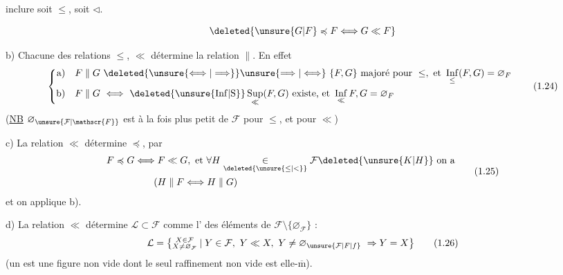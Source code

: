 inclure soit $\leq$, soit $\triangleleft$.

\[
\deleted{\unsure{G|F}\preccurlyeq F\Longleftrightarrow G\ll F}
\]

b) Chacune des relations $\leq$, $\ll$ détermine la relation $\parallel$. En effet
\[
\left\{\begin{aligned}
\text{a)}\quad F\parallel G &\ \deleted{\unsure{\Longleftrightarrow|\Longrightarrow}}\unsure{\Longrightarrow|\Longleftrightarrow}\
 \{F,G\}\ \text{majoré pour }\leq,\ \text{et }\mathop{\mathrm{Inf}}\limits_{\leq}(F,G)=\varnothing_F\\
\text{b)}\quad F\parallel G &\ \Longleftrightarrow\
 \deleted{\unsure{\mathrm{Inf}|\mathrm{S}}}\mathop{\mathrm{Sup}}\limits_{\ll}(F,G)\ \text{existe, et }\mathop{\mathrm{Inf}}\limits_{\ll} F,G=\varnothing_F
\end{aligned}\right.
\tag*{(1.24)}
\]
(\uline{NB} $\varnothing_{\unsure{\mathcal{F}|\mathscr{F}}}$ est à la fois plus petit  de $\mathcal{F}$ pour $\leq$, et pour $\ll$)

c) La relation $\ll$ détermine $\preccurlyeq$, par
\margin{$\times$}
\[
\begin{aligned}
F\preccurlyeq G &\Longleftrightarrow F\ll G,\ \text{et }\forall H\underset{\deleted{\unsure{\leq|<}}}{\in}\mathcal{F}\deleted{\unsure{K|H}}\ \text{on a}\\
&\hspace{2em}(H\parallel F\Longleftrightarrow H\parallel G)
\end{aligned}
\tag*{(1.25)}
\]
et on applique b).

d) La relation $\ll$ détermine $\mathcal{L}\subset\mathcal{F}$ comme l' des éléments  de $\mathcal{F}\setminus\{\varnothing_{\mathcal{F}}\}$ :
\[
\mathcal{L}=\bigl\{\substack{X\in\mathcal{F}\\ X\neq\varnothing_{\mathcal{F}}}\mid
 Y\in\mathcal{F},\ Y\ll X,\ Y\neq\varnothing_{\unsure{\mathcal{F}|F|f}}\ \Rightarrow Y=X\bigr\} \tag*{(1.26)}
\]
(un \unsure{lieu|lien} est une figure non vide dont le seul raffinement non vide est elle-$\overline{\mathrm m}$).

